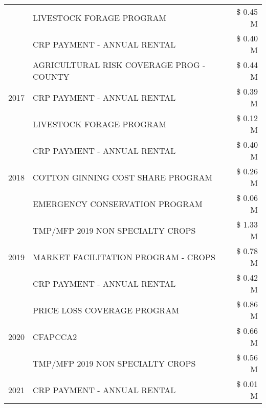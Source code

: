 \begin{tabular}{llr}
 & LIVESTOCK FORAGE PROGRAM & \$ 0.45 M \\
 & CRP PAYMENT - ANNUAL RENTAL & \$ 0.40 M \\
\cline{1-3}
\multirow[t]{3}{*}{2017} & AGRICULTURAL RISK COVERAGE PROG - COUNTY & \$ 0.44 M \\
 & CRP PAYMENT - ANNUAL RENTAL & \$ 0.39 M \\
 & LIVESTOCK FORAGE PROGRAM & \$ 0.12 M \\
\cline{1-3}
\multirow[t]{3}{*}{2018} & CRP PAYMENT - ANNUAL RENTAL & \$ 0.40 M \\
 & COTTON GINNING COST SHARE PROGRAM & \$ 0.26 M \\
 & EMERGENCY CONSERVATION PROGRAM & \$ 0.06 M \\
\cline{1-3}
\multirow[t]{3}{*}{2019} & TMP/MFP 2019 NON SPECIALTY CROPS & \$ 1.33 M \\
 & MARKET FACILITATION PROGRAM - CROPS & \$ 0.78 M \\
 & CRP PAYMENT - ANNUAL RENTAL & \$ 0.42 M \\
\cline{1-3}
\multirow[t]{3}{*}{2020} & PRICE LOSS COVERAGE PROGRAM & \$ 0.86 M \\
 & CFAPCCA2 & \$ 0.66 M \\
 & TMP/MFP 2019 NON SPECIALTY CROPS & \$ 0.56 M \\
\cline{1-3}
2021 & CRP PAYMENT - ANNUAL RENTAL & \$ 0.01 M \\
\cline{1-3}
\bottomrule
\end{tabular}
